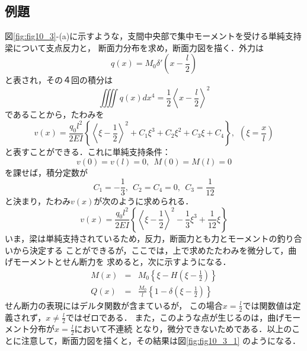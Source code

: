 \documentclass[10pt,a4j]{jbook}
\begin{document}
\subsection{例題}
図\ref{fig:fig10_3}-(a)に示すような，支間中央部で集中モーメントを受ける単純支持梁について支点反力と，
断面力分布を求め，断面力図を描く．外力は
\begin{equation}
	q(x)=M_0\delta'\left(x-\frac{l}{2}\right)
\end{equation}
と表され，その４回の積分は
\begin{equation}
	\iiiint q(x)dx^4 =\frac{1}{2}\left< x-\frac{l}{2}\right>^2
\end{equation}
であることから，たわみを
\begin{equation}
	v(x)=\frac{q_0l^2}{2EI}\left\{ \left< \xi -\frac{1}{2} \right>^2+C_1\xi^3 +C_2\xi^2+C_3\xi+C_4\right\}, \ \ 
	\left(\xi=\frac{x}{l}\right)
\end{equation}
と表すことができる．これに単純支持条件：
\begin{equation}
	v(0)=v(l)=0, \ \ M(0)=M(l)=0
\end{equation}
を課せば，積分定数が
\begin{equation}
	C_1=-\frac{1}{3}, \ \ C_2=C_4=0, \ \ C_3=\frac{1}{12}
\end{equation}
と決まり，たわみ$v(x)$が次のように求められる．
\begin{equation}
	v(x)=\frac{q_0l^2}{2EI}\left\{ \left< \xi -\frac{1}{2} \right>^2-\frac{1}{3}\xi^3 +\frac{1}{12}\xi \right\}
\end{equation}
いま，梁は単純支持されているため，反力，断面力とも力とモーメントの釣り合いから決定する
ことができるが，ここでは，上で求めたたわみを微分して，曲げモーメントとせん断力を
求めると，次に示すようになる．
\begin{eqnarray}
	M(x) &= & 
		M_0\left\{ \xi -H \left(\xi-\frac{1}{2}\right) \right\} \\
	Q(x) &= & 
		\frac{M_0}{l}\left\{1 -\delta\left(\xi-\frac{1}{2}\right)  \right\}
\end{eqnarray}
せん断力の表現にはデルタ関数が含まているが，
この場合$x=\frac{l}{2}$では関数値は定義されず，$x\neq \frac{l}{2}$ではゼロである．
また，このような点が生じるのは，曲げモーメント分布が$x=\frac{l}{2}$において不連続
となり，微分できないためである．以上のことに注意して，断面力図を描くと，その結果は図\ref{fig:fig10_3_1}
のようになる．
\end{document}
